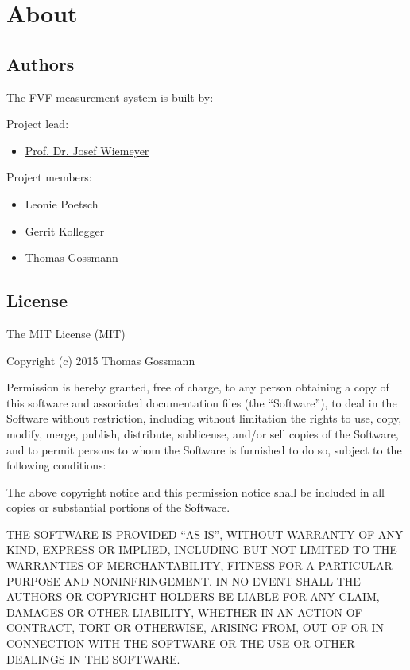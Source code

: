 \part{About}

\chapter{Authors}
\label{about/authors:welcome-to-the-fvf-measurement-system-documentation}\label{about/authors::doc}\label{about/authors:authors}
The FVF measurement system is built by:

Project lead:
\begin{itemize}
\item
\href{http://www.sport.tu-darmstadt.de/sportinstitut/personal/professoren/wiemeyer\_seiten/wiemeyer\_profil.de.jsp}{Prof. Dr. Josef Wiemeyer}

\end{itemize}

Project members:
\begin{itemize}
\item Leonie Poetsch
\item Gerrit Kollegger
\item Thomas Gossmann
\end{itemize}

\chapter{License}
\label{about/license::doc}\label{about/license:license}
The MIT License (MIT)

Copyright (c) 2015 Thomas Gossmann

Permission is hereby granted, free of charge, to any person obtaining a copy
of this software and associated documentation files (the ``Software''), to deal
in the Software without restriction, including without limitation the rights
to use, copy, modify, merge, publish, distribute, sublicense, and/or sell
copies of the Software, and to permit persons to whom the Software is
furnished to do so, subject to the following conditions:

The above copyright notice and this permission notice shall be included in all
copies or substantial portions of the Software.

THE SOFTWARE IS PROVIDED ``AS IS'', WITHOUT WARRANTY OF ANY KIND, EXPRESS OR
IMPLIED, INCLUDING BUT NOT LIMITED TO THE WARRANTIES OF MERCHANTABILITY,
FITNESS FOR A PARTICULAR PURPOSE AND NONINFRINGEMENT. IN NO EVENT SHALL THE
AUTHORS OR COPYRIGHT HOLDERS BE LIABLE FOR ANY CLAIM, DAMAGES OR OTHER
LIABILITY, WHETHER IN AN ACTION OF CONTRACT, TORT OR OTHERWISE, ARISING FROM,
OUT OF OR IN CONNECTION WITH THE SOFTWARE OR THE USE OR OTHER DEALINGS IN THE
SOFTWARE.


